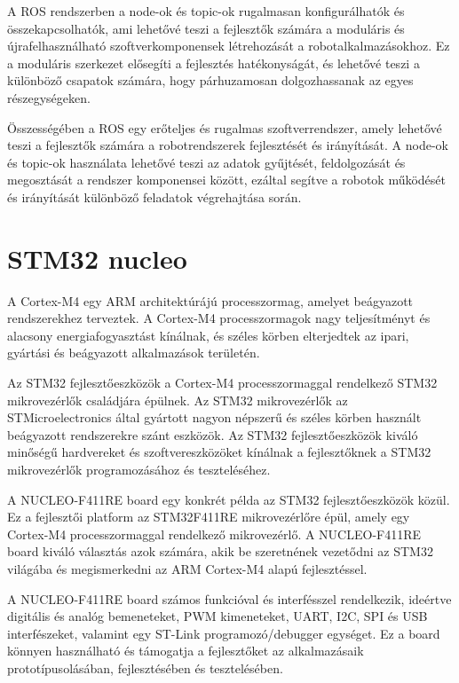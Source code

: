 A ROS rendszerben a node-ok és topic-ok rugalmasan konfigurálhatók és összekapcsolhatók, ami lehetővé teszi a fejlesztők számára a moduláris és újrafelhasználható szoftverkomponensek létrehozását a robotalkalmazásokhoz. Ez a moduláris szerkezet elősegíti a fejlesztés hatékonyságát, és lehetővé teszi a különböző csapatok számára, hogy párhuzamosan dolgozhassanak az egyes részegységeken.

Összességében a ROS egy erőteljes és rugalmas szoftverrendszer, amely lehetővé teszi a fejlesztők számára a robotrendszerek fejlesztését és irányítását. A node-ok és topic-ok használata lehetővé teszi az adatok gyűjtését, feldolgozását és megosztását a rendszer komponensei között, ezáltal segítve a robotok működését és irányítását különböző feladatok végrehajtása során.

\section{STM32 nucleo}
A Cortex-M4 egy ARM architektúrájú processzormag, amelyet beágyazott rendszerekhez terveztek. A Cortex-M4 processzormagok nagy teljesítményt és alacsony energiafogyasztást kínálnak, és széles körben elterjedtek az ipari, gyártási és beágyazott alkalmazások területén.

Az STM32 fejlesztőeszközök a Cortex-M4 processzormaggal rendelkező STM32 mikrovezérlők családjára épülnek. Az STM32 mikrovezérlők az STMicroelectronics által gyártott nagyon népszerű és széles körben használt beágyazott rendszerekre szánt eszközök. Az STM32 fejlesztőeszközök kiváló minőségű hardvereket és szoftvereszközöket kínálnak a fejlesztőknek a STM32 mikrovezérlők programozásához és teszteléséhez.

A NUCLEO-F411RE board egy konkrét példa az STM32 fejlesztőeszközök közül. Ez a fejlesztői platform az STM32F411RE mikrovezérlőre épül, amely egy Cortex-M4 processzormaggal rendelkező mikrovezérlő. A NUCLEO-F411RE board kiváló választás azok számára, akik be szeretnének vezetődni az STM32 világába és megismerkedni az ARM Cortex-M4 alapú fejlesztéssel.

A NUCLEO-F411RE board számos funkcióval és interfésszel rendelkezik, ideértve digitális és analóg bemeneteket, PWM kimeneteket, UART, I2C, SPI és USB interfészeket, valamint egy ST-Link programozó/debugger egységet. Ez a board könnyen használható és támogatja a fejlesztőket az alkalmazásaik prototípusolásában, fejlesztésében és tesztelésében.

